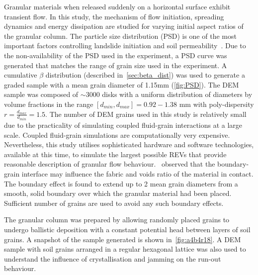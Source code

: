 Granular materials when released suddenly on a 
horizontal surface exhibit transient flow. In this study, the mechanism of flow 
initiation, spreading dynamics and energy dissipation are studied for varying 
initial aspect ratios of the granular column. The particle size distribution 
(PSD) is one of the most important factors controlling landslide initiation and 
soil permeability~\citep{Utili2014}. Due to the non-availability of the PSD 
used in the experiment, a PSD curve was generated that matches the range of 
grain size used in the experiment. A cumulative $\beta$ distribution 
(described in~\cref{sec:beta_dist}) was used to generate a graded sample with a 
mean grain diameter of 1.15\si{\mm} (\cref{fig:PSD}). 
The DEM sample was composed of $\sim3000$ disks with a uniform distribution of 
diameters by volume fractions in the range $[d_{min}, d_{max}] = 0.92 - 1.38$ 
\si{\mm} with poly-dispersity $r = \frac{d_{max} }{d_{min}} = 1.5$. The number 
of DEM grains used in this study is relatively small due to the practicality of 
simulating coupled fluid-grain interactions at a large scale. Coupled 
fluid-grain simulations are computationally very expensive. Nevertheless, this 
study utilises sophisticated hardware and software technologies, available at 
this time, to simulate the largest possible REVs that provide reasonable 
description of granular flow behaviour.~\citet{Marketos2009} observed that the 
boundary-grain interface may influence the fabric and voids ratio of the 
material in contact. The boundary effect is found to extend up to 2 mean grain 
diameters from a smooth, solid boundary over which the granular material had 
been placed. Sufficient number of grains are used to avoid any such boundary 
effects. 

The granular column was prepared by allowing randomly placed grains to undergo 
ballistic deposition with a constant potential head between layers of soil 
grains. A snapshot of the sample generated is shown in~\cref{fig:a4b4r18}. A 
DEM sample with soil grains arranged in a regular hexagonal lattice was also 
used to understand the influence of crystallisation and jamming on the run-out 
behaviour. 

